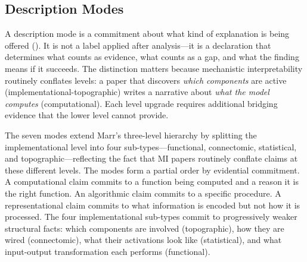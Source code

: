 \documentclass{article}
\begin{document}
\subsection{Description Modes}
\label{sec:description-modes}

A description mode is a commitment about what kind of explanation is being offered (). It is not a label applied after analysis---it is a declaration that determines what counts as evidence, what counts as a gap, and what the finding means if it succeeds. The distinction matters because mechanistic interpretability routinely conflates levels: a paper that discovers \emph{which components} are active (implementational-topographic) writes a narrative about \emph{what the model computes} (computational). Each level upgrade requires additional bridging evidence that the lower level cannot provide.

The seven modes extend Marr's three-level hierarchy \citep{marr1982vision} by splitting the implementational level into four sub-types---functional, connectomic, statistical, and topographic---reflecting the fact that MI papers routinely conflate claims at these different levels. The modes form a partial order by evidential commitment. A computational claim commits to a function being computed and a reason it is the right function. An algorithmic claim commits to a specific procedure. A representational claim commits to what information is encoded but not how it is processed. The four implementational sub-types commit to progressively weaker structural facts: which components are involved (topographic), how they are wired (connectomic), what their activations look like (statistical), and what input-output transformation each performs (functional).
\end{document}
